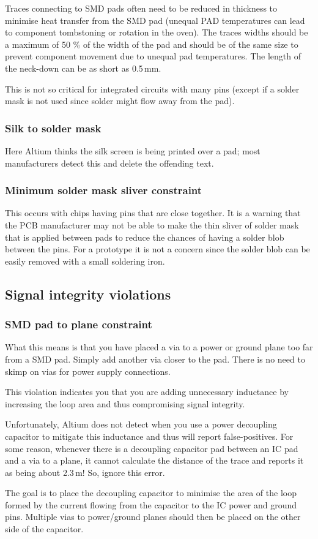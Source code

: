 Traces connecting to SMD pads often need to be reduced in thickness to
minimise heat transfer from the SMD pad (unequal PAD temperatures can
lead to component tombstoning or rotation in the oven).  The traces
widths should be a maximum of 50 \% of the width of the pad and should
be of the same size to prevent component movement due to unequal pad
temperatures.  The length of the neck-down can be as short as 0.5\,mm.

This is not so critical for integrated circuits with many pins (except
if a solder mask is not used since solder might flow away from the
pad).


\subsubsection{Silk to solder mask}

Here Altium thinks the silk screen is being printed over a pad; most
manufacturers detect this and delete the offending text.


\subsubsection{Minimum solder mask sliver constraint}

This occurs with chips having pins that are close together.  It is a
warning that the PCB manufacturer may not be able to make the thin
sliver of solder mask that is applied between pads to reduce the
chances of having a solder blob between the pins.  For a prototype it
is not a concern since the solder blob can be easily removed with a
small soldering iron.


\subsection{Signal integrity violations}

\subsubsection{SMD pad to plane constraint}

What this means is that you have placed a via to a power or ground
plane too far from a SMD pad.  Simply add another via closer to the
pad.  There is no need to skimp on vias for power supply connections.

This violation indicates you that you are adding unnecessary
inductance by increasing the loop area and thus compromising signal
integrity.

Unfortunately, Altium does not detect when you use a power decoupling
capacitor to mitigate this inductance and thus will report
false-positives.  For some reason, whenever there is a decoupling
capacitor pad between an IC pad and a via to a plane, it cannot
calculate the distance of the trace and reports it as being about
2.3\,m!  So, ignore this error.

The goal is to place the decoupling capacitor to minimise the area of
the loop formed by the current flowing from the capacitor to the IC
power and ground pins.  Multiple vias to power/ground planes should
then be placed on the other side of the capacitor.
